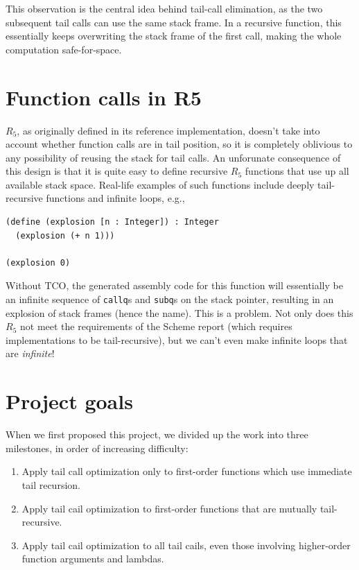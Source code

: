 \documentclass[12pt]{article}
\begin{document}
This observation is the central idea behind tail-call elimination,
as the two subsequent tail calls can use the same stack frame. In a
recursive function, this essentially keeps overwriting the stack frame
of the first call, making the whole computation safe-for-space.

\section{Function calls in R5}
$R_5$, as originally defined in its reference implementation, doesn't take into
account whether function calls are in tail position, so it is completely oblivious to
any possibility of reusing the stack for tail calls. An unforunate consequence of this design
is that it is quite easy to define recursive $R_5$ functions that use up all available
stack space. Real-life examples of such functions include deeply tail-recursive functions
and infinite loops, e.g.,

\begin{verbatim}
(define (explosion [n : Integer]) : Integer
  (explosion (+ n 1)))

(explosion 0)
\end{verbatim}

Without TCO, the generated assembly code for this function
will essentially be an infinite sequence of
\verb+callq+s and \verb+subq+s on the stack pointer, resulting in an
explosion of stack frames (hence the name). This is a problem. Not only does this
$R_5$ not meet the requirements of the Scheme report (which requires implementations
to be tail-recursive), but we can't even make infinite loops that are \emph{infinite}!

\section{Project goals}

When we first proposed this project, we divided up the work into three milestones,
in order of increasing difficulty:

\begin{enumerate}
 \item Apply tail call optimization only to first-order functions which use
       immediate tail recursion.
 \item Apply tail cail optimization to first-order functions that are mutually
       tail-recursive.
 \item  Apply tail cail optimization to all tail cails, even those involving
        higher-order function arguments and lambdas.
\end{enumerate}
\end{document}
